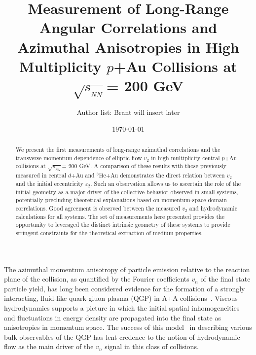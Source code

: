\documentclass[%
reprint,
showpacs,preprintnumbers,
 amsmath,amssymb,
 aps,
]{revtex4-1}
\newcommand{\sqsn}{\mbox{$\sqrt{s_{_{NN}}}$}\xspace}
\newcommand{\dau}{\mbox{$d$+Au}\xspace}
\newcommand{\pau}{\mbox{$p$+Au}\xspace}
\newcommand{\hau}{\mbox{$^3\text{He}$+Au}\xspace}
\begin{document}
\title{Measurement of Long-Range Angular Correlations and Azimuthal Anisotropies in High Multiplicity \pau Collisions at \sqsn = 200 GeV}%

\author{Author list: Brant will insert later}

\date{\today}%

\begin{abstract}
We present the first measurements of long-range azimuthal correlations and the transverse momentum dependence of elliptic flow $v_2$ in high-multiplicity central \pau collisions at \sqsn = 200 GeV. A comparison of these results with those previously measured in central \dau and \hau demonstrates the direct relation between $v_2$ and the initial eccentricity $\varepsilon_2$. Such an observation allows us to ascertain the role of the initial geometry as a major driver of the collective behavior observed in small systems, potentially precluding theoretical explanations based on momentum-space domain correlations. Good agreement is observed between the measured $v_2$ and hydrodynamic calculations for all systems. The set of measurements here presented provides the opportunity to leveraged the distinct intrinsic geometry of these systems to provide stringent constraints for the theoretical extraction of medium properties. 
\end{abstract}

\maketitle

The azimuthal momentum anisotropy of particle emission relative to the reaction plane of the collision, as quantified by the Fourier coefficients $v_n$ of the final state particle yield, has long been considered evidence for the formation of a strongly interacting, fluid-like quark-gluon plasma (QGP) in A+A collisions~\cite{Snellings:2011sz}. Viscous hydrodynamics supports a picture in which the initial spatial inhomogeneities and fluctuations in energy density are propagated into the final state as anisotropies in momentum space.  The success of this model~\cite{Luzum:2008cw} in describing various bulk observables of the QGP has lent credence to the notion of hydrodynamic flow as the main driver of the $v_{n}$ signal in this class of collisions.
\end{document}

